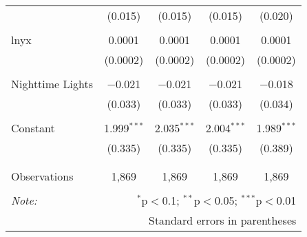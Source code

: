 \begin{table}[!htbp]
\begin{tabular}{@{\extracolsep{5pt}}lcccc}
  & (0.015) & (0.015) & (0.015) & (0.020) \\ 
  & & & & \\ 
 lnyx & 0.0001 & 0.0001 & 0.0001 & 0.0001 \\ 
  & (0.0002) & (0.0002) & (0.0002) & (0.0002) \\ 
  & & & & \\ 
 Nighttime Lights & $-$0.021 & $-$0.021 & $-$0.021 & $-$0.018 \\ 
  & (0.033) & (0.033) & (0.033) & (0.034) \\ 
  & & & & \\ 
 Constant & 1.999$^{***}$ & 2.035$^{***}$ & 2.004$^{***}$ & 1.989$^{***}$ \\ 
  & (0.335) & (0.335) & (0.335) & (0.389) \\ 
  & & & & \\ 
\hline \\[-1.8ex] 
Observations & 1,869 & 1,869 & 1,869 & 1,869 \\ 
\hline 
\hline \\[-1.8ex] 
\textit{Note:}  & \multicolumn{4}{r}{$^{*}$p$<$0.1; $^{**}$p$<$0.05; $^{***}$p$<$0.01} \\ 
 & \multicolumn{4}{r}{Standard errors in parentheses} \\ 
\end{tabular} 
\end{table} 
